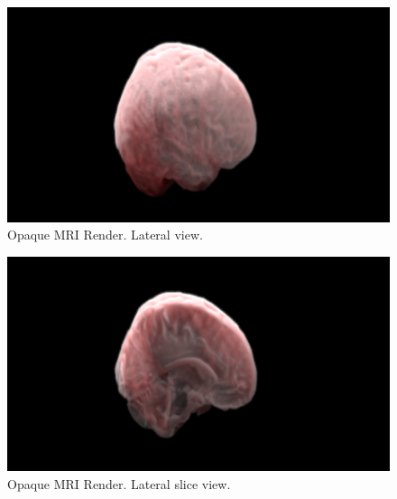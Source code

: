 \begin{figure}[ht]
 \centering %
 \includegraphics[width=\columnwidth]{pictures/bt-noalphared-lateral.png}
 \caption{Opaque MRI Render. Lateral view.}
 \label{fig:noalphared-lateral}
\end{figure}

\begin{figure}[h]
 \centering %
 \includegraphics[width=\columnwidth]{pictures/bt-noalphared-lateral-slice.png}
 \caption{Opaque MRI Render. Lateral slice view.}
 \label{fig:noalphared-lateral-slice}
\end{figure}

